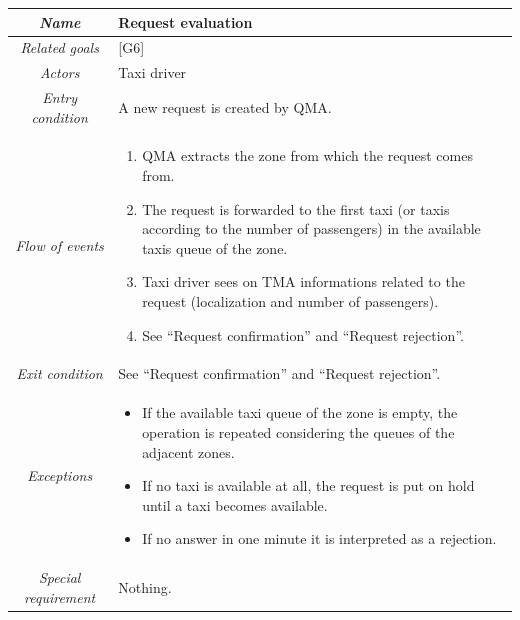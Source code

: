\begin{flushleft}
\begin{tabular}{c|>{\centering}p{10cm}}
\hline 
\emph{Name} & \raggedright{}Request evaluation\tabularnewline
\hline 
\emph{Related goals} & \raggedright{}{[}G6{]}\tabularnewline
\hline 
\emph{Actors} & \raggedright{}Taxi driver\tabularnewline
\hline 
\emph{Entry condition} & \raggedright{}A new request is created by QMA.\tabularnewline
\hline 
\emph{Flow of events} & \begin{enumerate}
\item \begin{raggedright}
QMA extracts the zone from which the request comes from.
\par\end{raggedright}
\item \begin{raggedright}
The request is forwarded to the first taxi (or taxis according to
the number of passengers) in the available taxis queue of the zone.
\par\end{raggedright}
\item \begin{raggedright}
Taxi driver sees on TMA informations related to the request (localization
and number of passengers).
\par\end{raggedright}
\item \raggedright{}See ``Request confirmation'' and ``Request rejection''.\end{enumerate}
\tabularnewline
\hline 
\emph{Exit condition} & \raggedright{}See ``Request confirmation'' and ``Request rejection''.\tabularnewline
\hline 
\emph{Exceptions} & \begin{itemize}
\item \begin{raggedright}
If the available taxi queue of the zone is empty, the operation is
repeated considering the queues of the adjacent zones.
\par\end{raggedright}
\item \begin{raggedright}
If no taxi is available at all, the request is put on hold until a
taxi becomes available.
\par\end{raggedright}
\item \raggedright{}If no answer in one minute it is interpreted as a rejection.\end{itemize}
\tabularnewline
\hline 
\emph{Special requirement} & \raggedright{}Nothing.\tabularnewline
\hline 
\end{tabular}
\par\end{flushleft}


